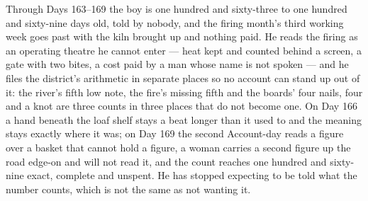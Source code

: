 \documentclass{design/chronicle}
\begin{document}
{Through Days 163–169 the boy is one hundred and sixty-three to one hundred and sixty-nine days old, told by nobody, and the firing month’s third working week goes past with the kiln brought up and nothing paid. He reads the firing as an operating theatre he cannot enter --- heat kept and counted behind a screen, a gate with two bites, a cost paid by a man whose name is not spoken --- and he files the district’s arithmetic in separate places so no account can stand up out of it: the river’s fifth low note, the fire’s missing fifth and the boards’ four nails, four and a knot are three counts in three places that do not become one. On Day 166 a hand beneath the loaf shelf stays a beat longer than it used to and the meaning stays exactly where it was; on Day 169 the second Account-day reads a figure over a basket that cannot hold a figure, a woman carries a second figure up the road edge-on and will not read it, and the count reaches one hundred and sixty-nine exact, complete and unspent. He has stopped expecting to be told what the number counts, which is not the same as not wanting it.

}
\end{document}
